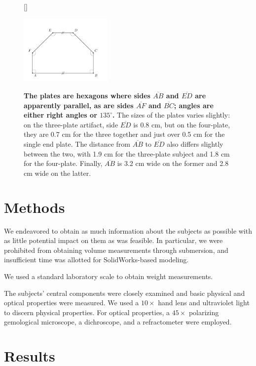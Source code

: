 \documentclass[10pt]{article}
\theoremstyle{definition}
\begin{document}
\begin{figure}
[\FBwidth]
{\caption{\label{fig:plate}\textbf{The plates are hexagons where sides $\overline{AB}$ and $\overline{ED}$ are apparently parallel, as are sides $\overline{AF}$ and $\overline{BC}$; angles are either right angles or $135^\circ$.} The sizes of the plates varies slightly: on the three-plate artifact, side $\overline{ED}$ is 0.8 cm, but on the four-plate, they are 0.7 cm for the three together and just over 0.5 cm for the single end plate. The distance from $\overline{AB}$ to $\overline{ED}$ also differs slightly between the two, with 1.9 cm for the three-plate subject and 1.8 cm for the four-plate. Finally, $\overline{AB}$ is 3.2 cm wide on the former and 2.8 cm wide on the latter.}}
{\includegraphics[width=0.4\textwidth]{plate.pdf}}
\end{figure}

\section{Methods}
We endeavored to obtain as much information about the subjects as possible with as little potential impact on them as was feasible.
In particular, we were prohibited from obtaining volume measurements through submersion, and insufficient time was allotted for SolidWorks-based modeling.

We used a standard laboratory scale to obtain weight measurements.

The subjects' central components were closely examined and basic physical and optical properties were measured.
We used a $10\times$ hand lens and ultraviolet light to discern physical properties.
For optical properties, a $45\times$ polarizing gemological microscope, a dichroscope, and a refractometer were employed.

\section{Results}
\end{document}
